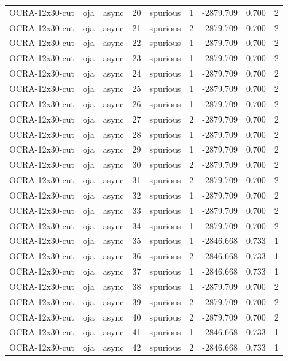 \begin{tabular}{lllrlrrrr}
OCRA-12x30-cut & oja & async & 20 & spurious & 1 & -2879.709 & 0.700 & 2 \\
OCRA-12x30-cut & oja & async & 21 & spurious & 2 & -2879.709 & 0.700 & 2 \\
OCRA-12x30-cut & oja & async & 22 & spurious & 1 & -2879.709 & 0.700 & 2 \\
OCRA-12x30-cut & oja & async & 23 & spurious & 1 & -2879.709 & 0.700 & 2 \\
OCRA-12x30-cut & oja & async & 24 & spurious & 1 & -2879.709 & 0.700 & 2 \\
OCRA-12x30-cut & oja & async & 25 & spurious & 1 & -2879.709 & 0.700 & 2 \\
OCRA-12x30-cut & oja & async & 26 & spurious & 1 & -2879.709 & 0.700 & 2 \\
OCRA-12x30-cut & oja & async & 27 & spurious & 2 & -2879.709 & 0.700 & 2 \\
OCRA-12x30-cut & oja & async & 28 & spurious & 1 & -2879.709 & 0.700 & 2 \\
OCRA-12x30-cut & oja & async & 29 & spurious & 1 & -2879.709 & 0.700 & 2 \\
OCRA-12x30-cut & oja & async & 30 & spurious & 2 & -2879.709 & 0.700 & 2 \\
OCRA-12x30-cut & oja & async & 31 & spurious & 2 & -2879.709 & 0.700 & 2 \\
OCRA-12x30-cut & oja & async & 32 & spurious & 1 & -2879.709 & 0.700 & 2 \\
OCRA-12x30-cut & oja & async & 33 & spurious & 1 & -2879.709 & 0.700 & 2 \\
OCRA-12x30-cut & oja & async & 34 & spurious & 1 & -2879.709 & 0.700 & 2 \\
OCRA-12x30-cut & oja & async & 35 & spurious & 1 & -2846.668 & 0.733 & 1 \\
OCRA-12x30-cut & oja & async & 36 & spurious & 2 & -2846.668 & 0.733 & 1 \\
OCRA-12x30-cut & oja & async & 37 & spurious & 1 & -2846.668 & 0.733 & 1 \\
OCRA-12x30-cut & oja & async & 38 & spurious & 1 & -2879.709 & 0.700 & 2 \\
OCRA-12x30-cut & oja & async & 39 & spurious & 2 & -2879.709 & 0.700 & 2 \\
OCRA-12x30-cut & oja & async & 40 & spurious & 2 & -2879.709 & 0.700 & 2 \\
OCRA-12x30-cut & oja & async & 41 & spurious & 1 & -2846.668 & 0.733 & 1 \\
OCRA-12x30-cut & oja & async & 42 & spurious & 2 & -2846.668 & 0.733 & 1 \\

\end{tabular}
